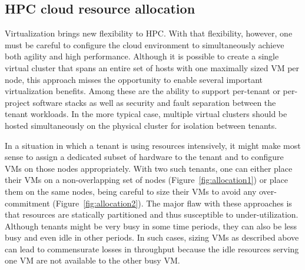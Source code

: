 \subsection{HPC cloud resource allocation}
Virtualization brings new flexibility to HPC. With that flexibility, however, one must be careful to configure 
the cloud environment to simultaneously achieve both agility and high performance.
Although it is possible to create a single virtual cluster that spans an entire set of hosts
with one maximally sized VM per node, this approach misses the opportunity to enable several important 
virtualization benefits. Among these are the ability to support per-tenant or per-project software stacks as well 
as security and fault separation between the tenant workloads. In the more typical case, multiple virtual 
clusters should be hosted simultaneously on the physical cluster for isolation between tenants.

In a situation in which a tenant is using resources intensively, it might make most sense to assign 
a dedicated subset of hardware to the tenant and to configure VMs on those nodes appropriately. 
With two such tenants, one can either place their VMs on a non-overlapping set of nodes (Figure~\ref{fig:allocation1})
or place them on the same nodes, being careful to size their VMs to avoid any over-commitment (Figure~\ref{fig:allocation2}). 
The major flaw with these approaches is that resources are statically partitioned and thus susceptible to under-utilization. 
Although tenants might be very busy in some 
time periods, they can also be less busy and even idle in other periods. In such cases, sizing VMs as 
described above can lead to commensurate losses in 
throughput because the idle resources serving one VM are not available to the other busy VM.

